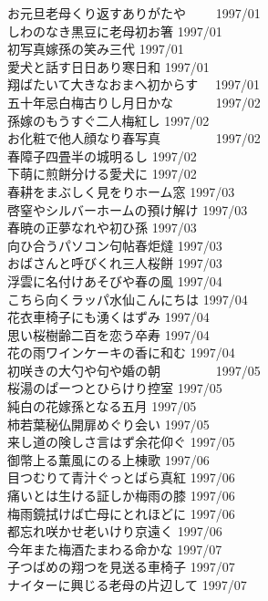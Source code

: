 \begin{multicols}{2}
お元旦老母くり返すありがたや　　 1997/01
\\しわのなき黒豆に老母初お箸 1997/01
\\初写真嫁孫の笑み三代 1997/01
\\愛犬と話す日日あり寒日和 1997/01
\\翔ばたいて大きなおまへ初からす　 1997/01　
\\五十年忌白梅古りし月日かな　　　 1997/02　
\\孫嫁のもうすぐ二人梅紅し 1997/02
\\お化粧で他人顔なり春写真　　　　 1997/02　
\\春障子四畳半の城明るし 1997/02
\\下萌に煎餅分ける愛犬に 1997/02
\\春耕をまぶしく見をりホーム窓 1997/03
\\啓窒やシルバーホームの預け解け 1997/03
\\春暁の正夢なれや初ひ孫 1997/03
\\向ひ合うパソコン句帖春炬燵 1997/03　
\\おばさんと呼びくれ三人桜餅 1997/03
\\浮雲に名付けあそびや春の風 1997/04
\\こちら向くラッパ水仙こんにちは 1997/04
\\花衣車椅子にも湧くはずみ 1997/04
\\思い桜樹齢二百を恋う卒寿 1997/04
\\花の雨ワインケーキの香に和む 1997/04
\\初咲きの大勺や句や婚の朝　　　　 1997/05
\\桜湯のぱーつとひらけり控室 1997/05
\\純白の花嫁孫となる五月 1997/05
\\柿若葉秘仏開扉めぐり会い 1997/05
\\来し道の険しさ言はず余花仰ぐ 1997/05
\\御幣上る薫風にのる上棟歌 1997/06
\\目つむりて青汁ぐっとばら真紅 1997/06
\\痛いとは生ける証しか梅雨の膝 1997/06
\\梅雨鏡拭けば亡母にとれほどに 1997/06
\\都忘れ咲かせ老いけり京遠く 1997/06
\\今年また梅酒たまわる命かな 1997/07
\\子つばめの翔つを見送る車椅子 1997/07
\\ナイターに興じる老母の片辺して 1997/07

\end{multicols}
